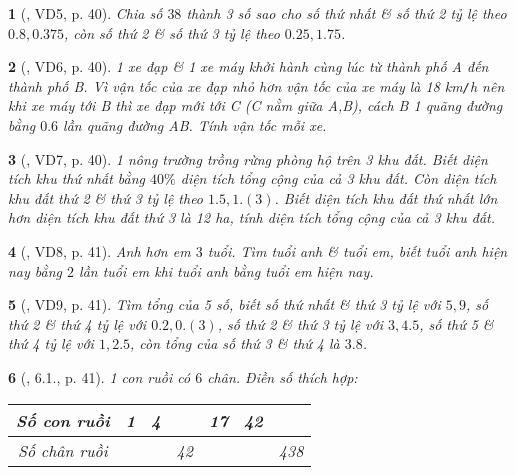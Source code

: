 \documentclass{article}
\newtheorem{baitoan}{}
\begin{document}
\begin{baitoan}[\cite{Binh_boi_duong_Toan_7_tap_1}, VD5, p. 40]
	Chia số $38$ thành 3 số sao cho số thứ nhất \& số thứ 2 tỷ lệ theo $0.8,0.375$, còn số thứ 2 \& số thứ 3 tỷ lệ theo $0.25,1.75$.
\end{baitoan}

\begin{baitoan}[\cite{Binh_boi_duong_Toan_7_tap_1}, VD6, p. 40]
	1 xe đạp \& 1 xe máy khởi hành cùng lúc từ thành phố A đến thành phố B. Vì vận tốc của xe đạp nhỏ hơn vận tốc của xe máy là {\rm18 km{\tt/}h} nên khi xe máy tới B thì xe đạp mới tới C (C nằm giữa A,B), cách B 1 quãng đường bằng $0.6$ lần quãng đường AB. Tính vận tốc mỗi xe.
\end{baitoan}

\begin{baitoan}[\cite{Binh_boi_duong_Toan_7_tap_1}, VD7, p. 40]
	1 nông trường trồng rừng phòng hộ trên 3 khu đất. Biết diện tích khu thứ nhất bằng $40\%$ diện tích tổng cộng của cả 3 khu đất. Còn diện tích khu đất thứ 2 \& thứ 3 tỷ lệ theo $1.5,1.(3)$. Biết diện tích khu đất thứ nhất lớn hơn diện tích khu đất thứ 3 là {\rm12 ha}, tính diện tích tổng cộng của cả 3 khu đất.
\end{baitoan}

\begin{baitoan}[\cite{Binh_boi_duong_Toan_7_tap_1}, VD8, p. 41]
	Anh hơn em $3$ tuổi. Tìm tuổi anh \& tuổi em, biết tuổi anh hiện nay bằng $2$ lần tuổi em khi tuổi anh bằng tuổi em hiện nay.
\end{baitoan}

\begin{baitoan}[\cite{Binh_boi_duong_Toan_7_tap_1}, VD9, p. 41]
	Tìm tổng của 5 số, biết số thứ nhất \& thứ 3 tỷ lệ với $5,9$, số thứ 2 \& thứ 4 tỷ lệ với $0.2,0.(3)$, số thứ 2 \& thứ 3 tỷ lệ với $3,4.5$, số thứ 5 \& thứ 4 tỷ lệ với $1,2.5$, còn tổng của số thứ 3 \& thứ 4 là $3.8$.
\end{baitoan}

\begin{baitoan}[\cite{Binh_boi_duong_Toan_7_tap_1}, 6.1., p. 41]
	1 con ruồi có $6$ chân. Điền số thích hợp:
	\begin{table}[H]
		\centering
		\begin{tabular}{|c|c|c|c|c|c|c|}
			\hline
			Số con ruồi & 1 & 4 &  & 17 & 42 & \\
			\hline
			Số chân ruồi & & & 42 &  &  & 438 \\
			\hline
		\end{tabular}
	\end{table}
\end{baitoan}
\end{document}
